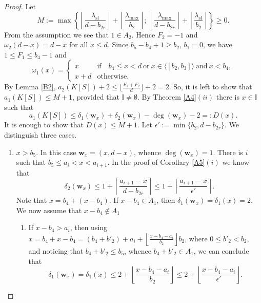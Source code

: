 \documentclass[11pt]{article}
\def\deg{\operatorname{deg}}
\def\wbf{{\mathbf w}}
\def\Iset{{\mathbb I}}
\theoremstyle{remark}
\theoremstyle{definition}
\begin{document}
\begin{proof} Let
$$M:=  \max\left\{ \left\lfloor \frac{ \lambda_{\mathrm{sl}}}{d-b_{2r}} \right\rfloor + \left\lfloor \frac{\lambda_{\max}}{b_2} \right\rfloor;\ \left\lfloor \frac{ \lambda_{\max}}{d-b_{2r}} \right\rfloor + \left\lfloor \frac{\lambda_{\mathrm{sl}}}{b_2} \right\rfloor \right\}\geq 0.$$
From the assumption we see that $1\in A_2$. Hence $F_2 = -1$ and $\omega_2(d- x) = d- x$ for all $x\leq d$. Since $b_5 - b_4 + 1\geq b_2$, $b_1= 0$,  we have $1 \leq F_1 \leq b_4 -1$ and
$$\omega_1(x) = \begin{cases} x & \text{if}\quad  b_4 \leq x < d \ \text{or} \ x \in \langle [b_2,b_3] \rangle \ \text{and}\ x< b_4,\\
x+ d &\text{otherwise}.
\end{cases}$$
 By Lemma \ref{B2}, $a_2(K[S]) + 2 \leq \lfloor \frac{F_1+ F_2}{d}\rfloor + 2 = 2$. So, it is left to  show that $a_1(K[S]) \leq M + 1 $, provided  that $\Iset\neq \emptyset$. By Theorem \ref{A4}\((ii)\) there is  $x\in \Iset$ such that
 $$a_1(K[S]) \leq \delta_1(\wbf_x ) + \delta_2(\wbf_x) - \deg(\wbf_x) - 2 =: D(x).$$
 It is enough to show that $D(x) \leq M + 1$. Let $\epsilon' := \min\{ b_2 , d-b_{2r}\}$. We distinguish three cases.
 \begin{enumerate}
     \item $ x>b_5$. In this case $\wbf_x = (x, d-x)$, whence $\deg(\wbf_x) = 1$.  There is $i$ such that $b_5\leq a_i < x < a_{i+1}$. In the proof of Corollary \ref{A5}\((i)\) we know that 
 \begin{equation}\label{EBd21}
\delta_2(\wbf_x) \leq 1 + \left\lceil \frac{a_{i+1} - x}{d- b_{2r}} \right\rceil \leq 1+ \left\lceil \frac{a_{i+1} - x}{\epsilon'} \right\rceil.
\end{equation}
  Note that $x = b_4 + (x-b_4)$. If $x-b_4 \in A_1$, then $\delta_1(\wbf_x) = \delta_1(x) = 2$. We now assume that $x-b_4 \not\in A_1$
  \begin{enumerate}[\((\text{a}1)\)]
      \item If $ x-b_4 > a_i$, then using $x= b_4 + x-b_4 = (b_4 + b'_2) + a_i +  \left\lfloor \frac{x-b_4 - a_i}{b_2} \right\rfloor b_2$, where $0\leq b'_2 < b_2$, and noticing that $b_4 + b'_2 \leq b_5$, whence $b_4+b'_2 \in A_1$, we can conclude that 
  \begin{equation}\label{EBd22}
  \delta_1(\wbf_x) = \delta_1(x) \leq 2 + \left\lfloor \frac{x-b_4 - a_i}{b_2} \right\rfloor  \leq 2+ \left\lfloor \frac{x-b_4 - a_i}{\epsilon'} \right\rfloor.
  \end{equation}

\end{enumerate}
\end{enumerate}
\end{proof}
\end{document}

